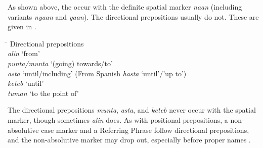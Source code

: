 As shown above, the  occur with the definite spatial marker \textit{naan} (including variants \textit{nyaan} and \textit{yaan}). The directional prepositions usually do not. These are given in .

\ea
\label{bkm:Ref480806122}
\begin{tabbing}
\hspace{2.5cm} \= \kill
Directional prepositions \\
\textit{alin} \> ‘from’ \\
\textit{punta/munta} \> ‘(going) towards/to’\footnotemark \\
\textit{asta} \> ‘until/including’  (From Spanish \textit{hasta} ‘until’/’up to’) \\
\textit{keteb} \> ‘until’ \\
\textit{tuman} \> ‘to the point of’
\end{tabbing}
\z

The directional prepositions \textit{munta}, \textit{asta}, and \textit{keteb} never occur with the spatial marker, though sometimes \textit{alin} does. As with positional prepositions, a non-absolutive case marker and a Referring Phrase follow directional prepositions, and the non-absolutive marker may drop out, especially before proper names .

